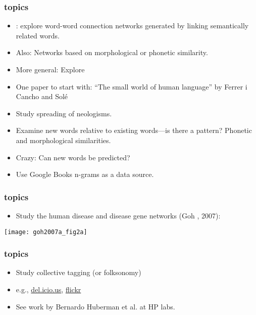 \begin{frame}
  \frametitle{topics}

  \begin{itemize}
  \item<1->
    : explore word-word
    connection networks generated by linking semantically related words.
  \item<2->
    Also: Networks based on morphological or phonetic similarity.
  \item<3-> 
    More general: Explore 
  \item<4->
    One paper to start with: ``The small world of human language''
    by Ferrer i Cancho and Sol\'{e}\cite{ferrericancho2001a}
  \item<5-> 
    Study spreading of
    neologisms.
  \item<6-> 
    Examine new words relative to existing words---is there 
    a pattern?  Phonetic and morphological similarities.
  \item<7-> 
    \alert{Crazy:} Can new words be predicted?
  \item<8-> 
    Use Google Books n-grams as a data source.
  \end{itemize}

\end{frame}



\begin{frame}
  \frametitle{topics}

  \begin{itemize}
  \item<1-> 
    Study the human disease and disease gene networks (Goh \etal, 2007):
  \end{itemize}
  \texttt{[image: goh2007a\_fig2a]}

\end{frame}


\begin{frame}
  \frametitle{topics}

  \begin{itemize}
  \item<1-> 
    Study \alert{collective tagging} (or folksonomy)
  \item<2-> 
    e.g., \href{http://del.icio.us}{del.icio.us}, \href{http://www.flickr.com}{flickr}
  \item<3-> 
    See work by Bernardo Huberman et al. at HP labs.
  \end{itemize}

\end{frame}

